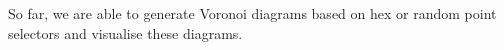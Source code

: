 
So far, we are able to generate Voronoi diagrams based on hex or random point selectors and visualise these diagrams.
